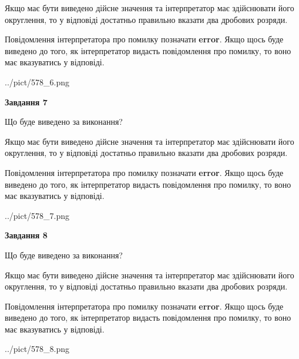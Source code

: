 \documentclass[12pt, ukrainian]{article}
\begin{document}
{\begin {Large}
Якщо має бути виведено дійсне значення та інтерпретатор має здійснювати його округлення, 
то у відповіді достатньо правильно вказати два дробових розряди.

Повідомлення інтерпретатора про помилку позначати \textbf{error}.
Якщо щось буде виведено до того, як інтерпретатор видасть повідомлення про помилку, 
то воно має вказуватись у відповіді. \par

\begin{center}
	{../pict/578_6.png}
\end{center}
\newpage

{\begin {center}\textbf{Завдання 7}\end {center}}\par
Що буде виведено за виконання? \par

Якщо має бути виведено дійсне значення та інтерпретатор має здійснювати його округлення, 
то у відповіді достатньо правильно вказати два дробових розряди.

Повідомлення інтерпретатора про помилку позначати \textbf{error}.
Якщо щось буде виведено до того, як інтерпретатор видасть повідомлення про помилку, 
то воно має вказуватись у відповіді. \par

\begin{center}
	{../pict/578_7.png}
\end{center}
\newpage

{\begin {center}\textbf{Завдання 8}\end {center}}\par
Що буде виведено за виконання? \par

Якщо має бути виведено дійсне значення та інтерпретатор має здійснювати його округлення, 
то у відповіді достатньо правильно вказати два дробових розряди.

Повідомлення інтерпретатора про помилку позначати \textbf{error}.
Якщо щось буде виведено до того, як інтерпретатор видасть повідомлення про помилку, 
то воно має вказуватись у відповіді. \par

\begin{center}
	{../pict/578_8.png}
\end{center}
\newpage


\end{Large}}
\end{document}
